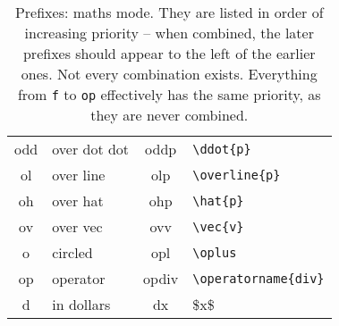 \documentclass[11pt]{article}
\begin{document}
\begin{table}[tbh]
\begin{center}
\begin{tabular}{>{\ttfamily}cl>{\ttfamily}c>{\ttfamily}l}
    odd& over dot dot     & oddp{}  & \verb.\ddot{p}. \\
    ol& over line         & olp{}   & \verb.\overline{p}. \\
    oh& over hat          & ohp{}   & \verb.\hat{p}. \\
    ov& over vec          & ovv{}   & \verb.\vec{v}. \\
    o & circled{}         & opl{}   & \verb.\oplus. \\
    op& operator          & opdiv{} & \verb.\operatorname{div}. \\
    d & in dollars        & dx{}    & \$x\$ \\
  \bottomrule
  \end{tabular}
\end{center}
  \caption{Prefixes: maths mode.
  They are listed in order of increasing priority -- when combined, the later prefixes should appear to the left of the earlier ones.
  Not every combination exists.
  Everything from \texttt{f} to \texttt{op} effectively has the same priority, as they are never combined.
  }
\end{table}



\end{document}
